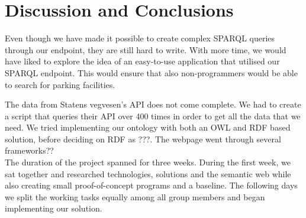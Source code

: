 \chapter{Discussion and Conclusions}

Even though we have made it possible to create complex SPARQL queries through our endpoint, they are still hard to write. With more time, we would have liked to explore the idea of an easy-to-use application that utilised our SPARQL endpoint. This would ensure that also non-programmers would be able to search for parking facilities.

The data from Statens vegvesen's API \cite{statensvegvesen} does not come complete. We had to create a script that queries their API over 400 times in order to get all the data that we need. We tried implementing our ontology with both an OWL and RDF based solution, before deciding on RDF as ???. The webpage went through several frameworks??\\

The duration of the project spanned for three weeks. During the first week, we sat together and researched technologies, solutions and the semantic web while also creating small proof-of-concept programs and a baseline. The following days we split the working tasks equally among all group members and began implementing our solution.
